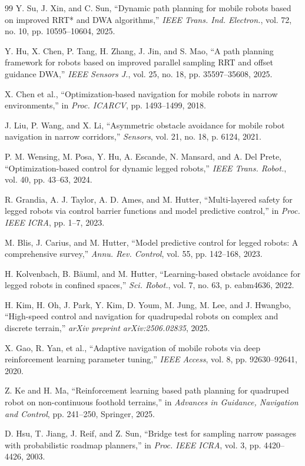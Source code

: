 \documentclass[lettersize,journal]{IEEEtran}
\begin{document}
\begin{thebibliography}{99}
Y. Su, J. Xin, and C. Sun, ``Dynamic path planning for mobile robots based on improved RRT* and DWA algorithms,'' \textit{IEEE Trans. Ind. Electron.}, vol. 72, no. 10, pp. 10595--10604, 2025.

Y. Hu, X. Chen, P. Tang, H. Zhang, J. Jin, and S. Mao, ``A path planning framework for robots based on improved parallel sampling RRT and offset guidance DWA,'' \textit{IEEE Sensors J.}, vol. 25, no. 18, pp. 35597--35608, 2025.

X. Chen et al., ``Optimization-based navigation for mobile robots in narrow environments,'' in \textit{Proc. ICARCV}, pp. 1493--1499, 2018.

J. Liu, P. Wang, and X. Li, ``Asymmetric obstacle avoidance for mobile robot navigation in narrow corridors,'' \textit{Sensors}, vol. 21, no. 18, p. 6124, 2021.

P. M. Wensing, M. Posa, Y. Hu, A. Escande, N. Mansard, and A. Del Prete, ``Optimization-based control for dynamic legged robots,'' \textit{IEEE Trans. Robot.}, vol. 40, pp. 43--63, 2024.

R. Grandia, A. J. Taylor, A. D. Ames, and M. Hutter, ``Multi-layered safety for legged robots via control barrier functions and model predictive control,'' in \textit{Proc. IEEE ICRA}, pp. 1--7, 2023.

M. Blis, J. Carius, and M. Hutter, ``Model predictive control for legged robots: A comprehensive survey,'' \textit{Annu. Rev. Control}, vol. 55, pp. 142--168, 2023.

H. Kolvenbach, B. B\"auml, and M. Hutter, ``Learning-based obstacle avoidance for legged robots in confined spaces,'' \textit{Sci. Robot.}, vol. 7, no. 63, p. eabm4636, 2022.

H. Kim, H. Oh, J. Park, Y. Kim, D. Youm, M. Jung, M. Lee, and J. Hwangbo, ``High-speed control and navigation for quadrupedal robots on complex and discrete terrain,'' \textit{arXiv preprint arXiv:2506.02835}, 2025.

X. Gao, R. Yan, et al., ``Adaptive navigation of mobile robots via deep reinforcement learning parameter tuning,'' \textit{IEEE Access}, vol. 8, pp. 92630--92641, 2020.

Z. Ke and H. Ma, ``Reinforcement learning based path planning for quadruped robot on non-continuous foothold terrains,'' in \textit{Advances in Guidance, Navigation and Control}, pp. 241--250, Springer, 2025.

D. Hsu, T. Jiang, J. Reif, and Z. Sun, ``Bridge test for sampling narrow passages with probabilistic roadmap planners,'' in \textit{Proc. IEEE ICRA}, vol. 3, pp. 4420--4426, 2003.

\end{thebibliography}
\end{document}
